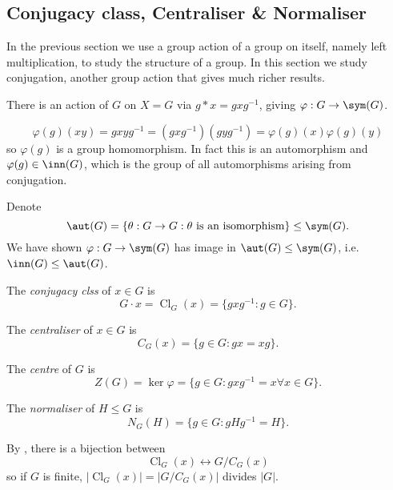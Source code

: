 \documentclass[a4paper]{article}
\DeclareMathOperator{\Cl}{Cl}
\begin{document}
\subsection{Conjugacy class, Centraliser \& Normaliser}

In the previous section we use a group action of a group on itself, namely left multiplication, to study the structure of a group. In this section we study conjugation, another group action that gives much richer results.

There is an action of \(G\) on \(X = G\) via \(g * x = gxg^{-1}\), giving \(\varphi: G \to \sym(G)\).

\begin{remark}
  \[
    \varphi(g)(xy) = gxyg^{-1} = (gxg^{-1})(gyg^{-1}) = \varphi(g)(x) \varphi(g)(y)
  \]
  so \(\varphi(g)\) is a group homomorphism. In fact this is an automorphism and \(\varphi(g) \in \inn(G)\), which is the group of all automorphisms arising from conjugation.
\end{remark}

Denote
\[
  \aut(G) = \{\theta: G \to G: \theta \text{ is an isomorphism}\} \leq \sym(G).
\]
We have shown \(\varphi: G \to \sym(G)\) has image in \(\aut(G) \leq \sym(G)\), i.e.\ \(\inn(G) \leq \aut(G)\).

\begin{definition}
  The \emph{conjugacy clss} of \(x \in G\) is
  \[
    G \cdot x = \Cl_G(x) = \{gxg^{-1}: g \in G\}.
  \]
\end{definition}

\begin{definition}[Centraliser]
  The \emph{centraliser} of \(x \in G\) is
  \[
    C_G(x) = \{g \in G: gx = xg\}.
  \]
\end{definition}

\begin{definition}[Centre]
  The \emph{centre} of \(G\) is
  \[
    Z(G) = \ker \varphi = \{g \in G: gxg^{-1} = x \forall x \in G\}.
  \]
\end{definition}

\begin{definition}[Normaliser]
  The \emph{normaliser} of \(H \leq G\) is
  \[
    N_G(H) = \{g \in G: gHg^{-1} = H\}.
  \]
\end{definition}

By , there is a bijection between
\[
  \Cl_G(x) \leftrightarrow G/C_G(x)
\]
so if \(G\) is finite, \(|\Cl_G(x)| = |G/C_G(x)|\) divides \(|G|\).
\end{document}
